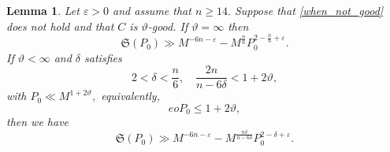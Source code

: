 \documentclass[12pt]{amsart}
\newtheorem{lemma}[theorem]{Lemma}
\theoremstyle{definition}
\numberwithin{equation}{section}
\begin{document}
\begin{lemma}
    \label{series_lower_bound}
Let $\varepsilon > 0$ and assume that $n \geq 14.$ Suppose that \eqref{when_not_good} does not hold and that $C$ is $\vartheta$-good. If $\vartheta = \infty$ then
\begin{equation*}
    \mathfrak{S}(P_0) \gg M^{-6n-\varepsilon}-M^{\frac{n}{6}}P_0^{2-\frac{n}{6}+\varepsilon}.
\end{equation*}
If $\vartheta < \infty$ and $\delta$ satisfies
\begin{equation}
    \label{circle_1}
    2<\delta<\frac{n}{6},
    \quad
    \frac{2n}{n-6\delta}<1+2\vartheta,
\end{equation}
with $P_{0} \ll M^{1+2\vartheta},$ equivalently, 
\begin{equation}
    \label{circle_2}
    eoP_0 \leq 1+2\vartheta,
\end{equation}
then we have
\begin{equation*}
    \mathfrak{S}(P_0) \gg M^{-6n-\varepsilon}-M^{\frac{n\delta}{n-6\delta}}P_0^{2-\delta+\varepsilon}.
\end{equation*}
\end{lemma}
\end{document}
